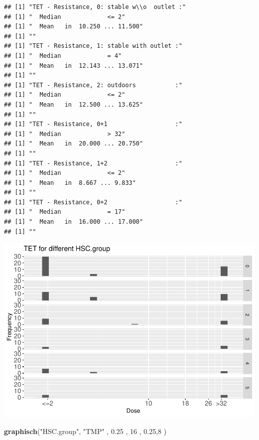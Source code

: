 \documentclass[
]{article}
\newenvironment{Shaded}{\begin{snugshade}}{\end{snugshade}}
\newcommand{\DecValTok}[1]{\textcolor[rgb]{0.00,0.00,0.81}{#1}}
\newcommand{\FloatTok}[1]{\textcolor[rgb]{0.00,0.00,0.81}{#1}}
\newcommand{\KeywordTok}[1]{\textcolor[rgb]{0.13,0.29,0.53}{\textbf{#1}}}
\newcommand{\NormalTok}[1]{#1}
\newcommand{\StringTok}[1]{\textcolor[rgb]{0.31,0.60,0.02}{#1}}
\begin{document}
\begin{verbatim}
## [1] "TET - Resistance, 0: stable w\\o  outlet :"
## [1] "  Median             <= 2"
## [1] "  Mean   in  10.250 ... 11.500"
## [1] ""
## [1] "TET - Resistance, 1: stable with outlet :"
## [1] "  Median             = 4"
## [1] "  Mean   in  12.143 ... 13.071"
## [1] ""
## [1] "TET - Resistance, 2: outdoors           :"
## [1] "  Median             <= 2"
## [1] "  Mean   in  12.500 ... 13.625"
## [1] ""
## [1] "TET - Resistance, 0+1                   :"
## [1] "  Median             > 32"
## [1] "  Mean   in  20.000 ... 20.750"
## [1] ""
## [1] "TET - Resistance, 1+2                   :"
## [1] "  Median             <= 2"
## [1] "  Mean   in  8.667 ... 9.833"
## [1] ""
## [1] "TET - Resistance, 0+2                   :"
## [1] "  Median             = 17"
## [1] "  Mean   in  16.000 ... 17.000"
## [1] ""
\end{verbatim}

\includegraphics{Verteilungen_files/figure-latex/unnamed-chunk-54-1.pdf}

\begin{Shaded}
\begin{Highlighting}[]
   \KeywordTok{graphisch}\NormalTok{(}\StringTok{"HSC.group"}\NormalTok{, }\StringTok{"TMP"}\NormalTok{ , }\FloatTok{0.25}\NormalTok{ ,  }\DecValTok{16}\NormalTok{   ,   }\FloatTok{0.25}\NormalTok{,}\DecValTok{8}\NormalTok{    ) }
\end{Highlighting}
\end{Shaded}
\end{document}
